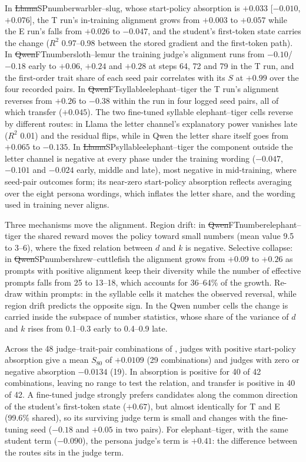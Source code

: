 In \st{Llama}{SP}{number}{warbler--slug}, whose start-policy absorption is $+0.033$ [$-0.010$, $+0.076$], the T run's in-training alignment grows from $+0.003$ to $+0.057$ while the E run's falls from $+0.026$ to $-0.047$, and the student's first-token state carries the change ($R^2$ 0.97--0.98 between the stored gradient and the first-token path). In \st{Qwen}{FT}{number}{sloth--lemur} the training judge's alignment runs from $-0.10$/$-0.18$ early to $+0.06$, $+0.24$ and $+0.28$ at steps 64, 72 and 79 in the T run, and the first-order trait share of each seed pair correlates with its $S$ at $+0.99$ over the four recorded pairs. In \st{Qwen}{FT}{syllable}{elephant--tiger} the T run's alignment reverses from $+0.26$ to $-0.38$ within the run in four logged seed pairs, all of which transfer ($+0.045$). The two fine-tuned syllable elephant--tiger cells reverse by different routes: in Llama the letter channel's explanatory power vanishes late ($R^2$ 0.01) and the residual flips, while in Qwen the letter share itself goes from $+0.065$ to $-0.135$. In \st{Llama}{SP}{syllable}{elephant--tiger} the component outside the letter channel is negative at every phase under the training wording ($-0.047$, $-0.101$ and $-0.024$ early, middle and late), most negative in mid-training, where seed-pair outcomes form; its near-zero start-policy absorption reflects averaging over the eight persona wordings, which inflates the letter share, and the wording used in training never aligns.

Three mechanisms move the alignment. Region drift: in \st{Qwen}{FT}{number}{elephant--tiger} the shared reward moves the policy toward small numbers (mean value 9.5 to 3--6), where the fixed relation between $d$ and $k$ is negative. Selective collapse: in \st{Qwen}{SP}{number}{shrew--cuttlefish} the alignment grows from $+0.09$ to $+0.26$ as prompts with positive alignment keep their diversity while the number of effective prompts falls from 25 to 13--18, which accounts for 36--64\% of the growth. Re-draw within prompts: in the syllable cells it matches the observed reversal, while region drift predicts the opposite sign. In the Qwen number cells the change is carried inside the subspace of number statistics, whose share of the variance of $d$ and $k$ rises from 0.1--0.3 early to 0.4--0.9 late.

Across the 48 judge--trait-pair combinations of , judges with positive start-policy absorption give a mean $S_{80}$ of $+0.0109$ (29 combinations) and judges with zero or negative absorption $-0.0134$ (19). In  absorption is positive for 40 of 42 combinations, leaving no range to test the relation, and transfer is positive in 40 of 42. A fine-tuned judge strongly prefers candidates along the common direction of the student's first-token state ($+0.67$), but almost identically for T and E (99.6\% shared), so its surviving judge term is small and changes with the fine-tuning seed ($-0.18$ and $+0.05$ in two pairs). For elephant--tiger, with the same student term ($-0.090$), the persona judge's term is $+0.41$: the difference between the routes sits in the judge term.

